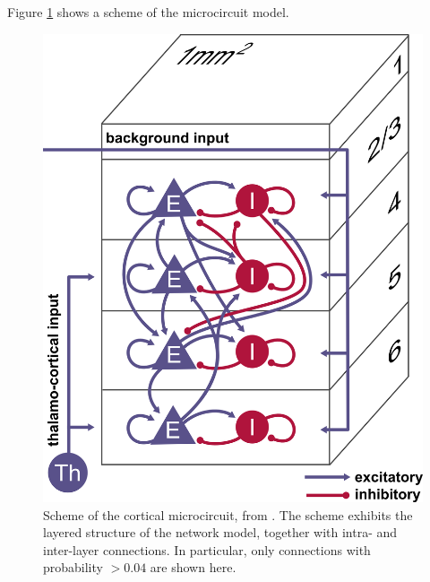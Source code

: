 \documentclass[a4paper, 12pt, twoside, openright]{book}
\begin{document}
Figure \ref{fig:microcircuit} shows a scheme of the microcircuit model.
\begin{figure}[H]
    \centering
    \includegraphics[scale=1.15]{figures/microcircuit.png}
    \caption{Scheme of the cortical microcircuit, from \cite{VanAlbada2018}. The scheme exhibits the layered structure of the network model, together with intra- and inter-layer connections. In particular, only connections with probability $>0.04$ are shown here.}
    \label{fig:microcircuit}
\end{figure}
\end{document}
